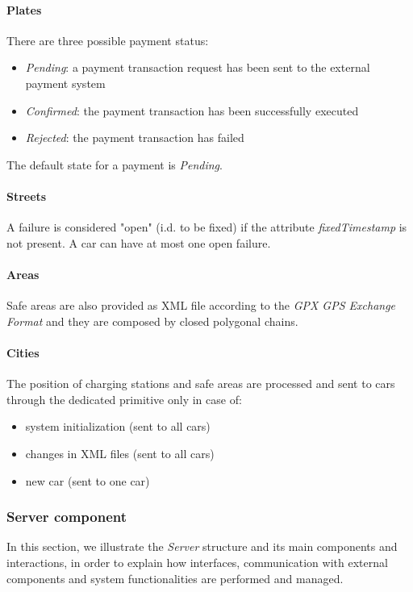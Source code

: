 \paragraph{Plates} There are three possible payment status:
\begin{itemize}
	\item \emph{Pending}: a payment transaction request has been sent to the external payment system
	\item \emph{Confirmed}: the payment transaction has been successfully executed
	\item \emph{Rejected}: the payment transaction has failed
\end{itemize}
The default state for a payment is \emph{Pending}.

\paragraph{Streets}A failure is considered "open" (i.d. to be fixed) if the attribute \emph{fixedTimestamp} is not present. A car can have at most one open failure.

\paragraph{Areas}Safe areas are also provided as XML file according to the \emph{GPX GPS Exchange Format} \cite{gpx} and they are composed by closed polygonal chains.

\paragraph{Cities}The position of charging stations and safe areas are processed and sent to cars through the dedicated primitive only in case of:
\begin{itemize}
	\item system initialization (sent to all cars)
	\item changes in XML files (sent to all cars)
	\item new car (sent to one car)
\end{itemize}

\clearpage
\subsubsection{Server component}
In this section, we illustrate the \emph{Server} structure and its main components and interactions, in order to explain how interfaces, communication with external components and system functionalities are performed and managed.
\\

